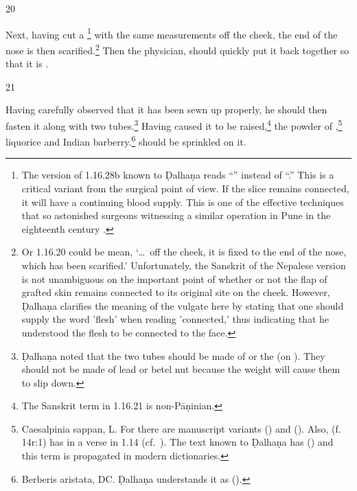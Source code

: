 \begin{translation}
\item[20] 

\begin{sloka}
    Next, having cut a \footnote{The
    version of 1.16.28b known to Ḍalhaṇa \citep[81]{vulgate} reads “” instead of “.”
    This is a critical variant from the surgical point of view.  If the slice remains
    connected, it will have a continuing blood supply.  This is one of the effective 
    techniques that so astonished surgeons witnessing a similar operation in Pune in
    the eighteenth century \citep[see][67--70]{wuja-2003}.} with the same
    measurements off the cheek, the end of the nose is then scarified.\footnote{Or 1.16.20 
    could be mean, 
    `\ldots\ off the cheek, it is fixed to the end of the nose, which has been
    scarified.' Unfortunately, the Sanskrit of the Nepalese version is not unambiguous on the
    important point of whether or not the flap of grafted skin remains connected
    to its original site on the cheek. However, Ḍalhaṇa \citep[81]{vulgate} clarifies the 
    meaning of the vulgate here by stating that one should supply the word 'flesh' when 
    reading 'connected,' thus indicating that he understood the flesh to be connected to the 
    face.} %
%
Then the  physician, 
    should quickly put it back together so that it is 
    .
    \label{well-joined}
\end{sloka}  


\item[21] 
\begin{sloka}
Having carefully observed that it has been sewn up properly, he should then fasten
it along with two tubes.\footnote{Ḍalhaṇa noted that the two tubes should be made
    of  or the  (on ). They should not be made of lead or betel nut because
    the weight will cause them to slip down.} Having caused it to be
    raised,\footnote{The Sanskrit term  in 1.16.21 is non-Pāṇinian.}
        the powder of ,\footnote{Caesalpinia sappan, L. %
            For  there are manuscript variants 
            () and  ().  Also,  (f.\,14r:1) has  in
            a verse in 1.14 (cf.\ ). The text known to Ḍalhaṇa  has
             () and this term is propagated in modern
            dictionaries.} %
            {liquorice} %
            and Indian barberry.\footnote{Berberis aristata, DC. %
                Ḍalhaṇa understands it as 
                (\cite[81]{vulgate}).} should be sprinkled on it.


\end{sloka}
\end{translation}
